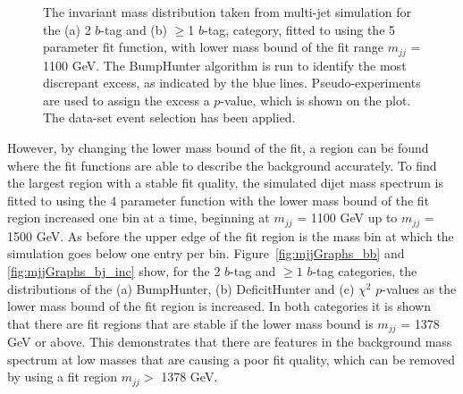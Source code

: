 \begin{figure}[!ht]
  \begin{center}
    \captionsetup[subfigure]{aboveskip=0pt,justification=centering}
  \end{center}
  \caption{ The invariant mass distribution taken from multi-jet simulation for the (a) 2 $b$-tag and (b) $\geq$1 $b$-tag,
    category, fitted to using the 5 parameter fit function, with lower mass bound of the fit range $m_{jj}$ = 1100 GeV.
    The BumpHunter algorithm is run to identify the most discrepant excess, as indicated by the blue lines.
    Pseudo-experiments are used to assign the excess a $p$-value, which is shown on the plot.
    The \summer{} data-set event selection has been applied.}
  \label{fig:Short_5para_1100_figure1}
\end{figure}

\FloatBarrier

However, by changing the lower mass bound of the fit,
a region can be found where the fit functions are able to describe the background accurately.
To find the largest region with a stable fit quality, the simulated dijet mass spectrum is
fitted to using the 4 parameter function with the lower mass bound of the fit region increased one bin at a time,
beginning at $m_{jj}$ = 1100 GeV up to $m_{jj}$ = 1500 GeV.
As before the upper edge of the fit region is the mass bin at which the simulation goes below one entry per bin.
Figure~\ref{fig:mjjGraphs_bb} and \ref{fig:mjjGraphs_bj_inc} show,
for the 2 $b$-tag and $\geq1$ $b$-tag categories, the distributions of the
(a) BumpHunter, (b) DeficitHunter and (c) $\chi^{2}$ $p$-values as the lower mass bound of the fit region is increased.
In both categories it is shown that there are fit regions that are stable if the lower mass bound is $m_{jj}$ = 1378 GeV or above.
This demonstrates that there are features in the background mass spectrum at low masses that are causing a poor fit quality,
which can be removed by using a fit region $m_{jj} >$ 1378 GeV. 

